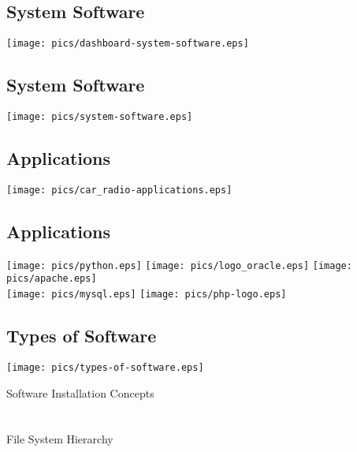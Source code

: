 \documentclass[xga]{xdvislides}
\begin{document}
\subsection{System Software}
\begin{center}
	\texttt{[image: pics/dashboard-system-software.eps]}
\end{center}

\subsection{System Software}
\begin{center}
	\texttt{[image: pics/system-software.eps]}
\end{center}

\subsection{Applications}
\begin{center}
	\texttt{[image: pics/car\_radio-applications.eps]}
\end{center}

\subsection{Applications}
\begin{center}
	\texttt{[image: pics/python.eps]}
	\texttt{[image: pics/logo\_oracle.eps]}
	\texttt{[image: pics/apache.eps]} \\
	\texttt{[image: pics/mysql.eps]}
	\texttt{[image: pics/php-logo.eps]}
\end{center}

\subsection{Types of Software}
\vfill
\begin{center}
	\texttt{[image: pics/types-of-software.eps]}
\end{center}
\vfill

\newpage
\vspace*{\fill}
\begin{center}
	\Hugesize
		Software Installation Concepts \\ [1em]
	\hspace*{5mm}
	\blueline\\
	\hspace*{5mm}\\
		File System Hierarchy
\end{center}
\vspace*{\fill}
\end{document}
